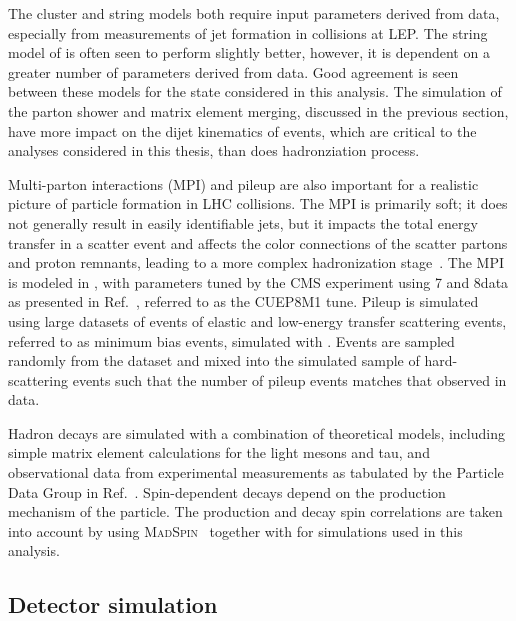 The cluster and string models both require input parameters derived from 
data, especially from measurements of jet formation in \EE collisions at LEP.
The string model of \PYTHIA is often seen to perform slightly better, however,
it is dependent on a greater number of parameters derived from data.
Good agreement is seen between these models for the \WZjj state considered in this analysis.
The simulation of the parton shower
and matrix element merging, discussed in the previous section, 
have more impact on the dijet kinematics of \WZjj events, which are critical
to the analyses considered in this thesis, 
than does hadronziation process.

Multi-parton interactions (MPI) and pileup are also important for a
realistic picture of particle formation in LHC collisions. The MPI is primarily
soft; it does not generally result in easily identifiable jets, but
it impacts the total energy transfer in a scatter event and affects the color
connections of the scatter partons and proton remnants, leading to a more complex
hadronization stage~\cite{Buckley:2011ms}. The MPI is modeled in \Pythia, with parameters tuned 
by the CMS experiment using 7 and 8\TeV data as presented in Ref.~\cite{Khachatryan:2015pea},
referred to as the CUEP8M1 tune. Pileup is simulated using large datasets of 
events of elastic and low-energy transfer \pp scattering events, referred
to as minimum bias events, simulated with . Events are sampled randomly
from the dataset and mixed into the simulated sample of hard-scattering events
such that the number of pileup events matches that observed in data.

Hadron decays are simulated with a combination of theoretical models,
including simple matrix element calculations for the light mesons and tau,
and observational data from experimental measurements as tabulated
by the Particle Data Group in Ref.~\cite{Tanabashi:2018oca}. Spin-dependent
decays depend on the production mechanism of the particle. 
The production and decay spin correlations are taken into account by using \textsc{MadSpin}~\cite{Artoisenet:2012st} 
together with \PYTHIA for simulations used in this analysis.

\subsection{Detector simulation}

